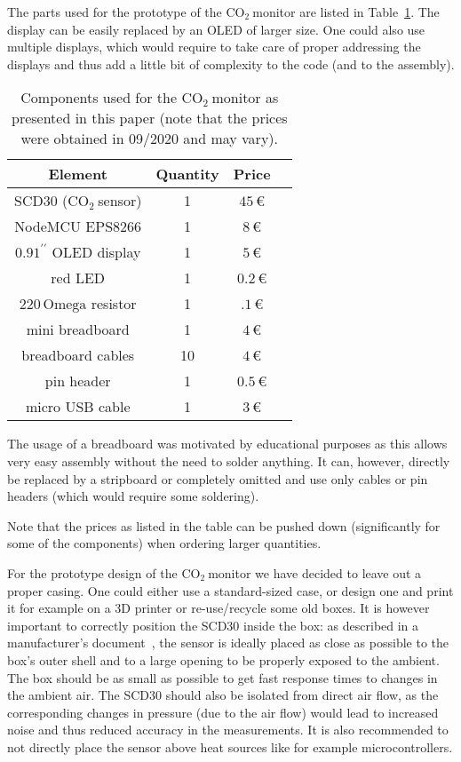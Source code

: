 \documentclass[12pt,a4paper]{article}
\newcommand{\inchsign}{^{\prime\prime}}
\newcommand{\coo}{\ensuremath{\mathrm{CO_2}~}}
\begin{document}
The parts used for the prototype of the \coo monitor are listed in Table~\ref{t:parts}. The display can be easily replaced by an OLED of larger size. One could also use multiple displays, which would require to take care of proper addressing the displays and thus add a little bit of complexity to the code (and to the assembly). 
\begin{table}\label{t:parts}
\center
\begin{tabular}{cccc}\toprule
Element & Quantity & Price \\\hline
SCD30 (\coo sensor) & 1 & $45\,$\euro \\
NodeMCU EPS8266 & 1 & $8\,$\euro \\
$0.91\inchsign$ OLED display	& 1	& $5\,$\euro \\
red LED					& 1 	& $0.2\,$\euro \\
$220\,\mathrm{Omega}$ resistor	& 1	& $.1\,$\euro \\
mini breadboard		& 1 & $4\,$\euro \\
breadboard cables	& 10 & $4\,$\euro \\
pin header			& 1 & $0.5\,$\euro \\
micro USB cable		& 1 & $3\,$\euro \\
\bottomrule
\end{tabular}
\caption{Components used for the \coo monitor as presented in this paper (note that the prices were obtained in 09/2020 and may vary).}
\end{table}

The usage of a breadboard was motivated by educational purposes as this allows very easy assembly without the need to solder anything. It can, however, directly be replaced by a stripboard or completely omitted and use only cables or pin headers (which would require some soldering). 

Note that the prices as listed in the table can be pushed down (significantly for some of the components) when ordering larger quantities. 

For the prototype design of the \coo monitor we have decided to leave out a proper casing. One could either use a standard-sized case, or design one and print it for example on a 3D printer or re-use/recycle some old boxes. It is however important to correctly position the SCD30 inside the box: as described in a manufacturer's document~\cite{SENSIRION2020A}, the sensor is ideally placed as close as possible to the box's outer shell and to a large opening to be properly exposed to the ambient. The box should be as small as possible to get fast response times to changes in the ambient air. The SCD30 should also be isolated from direct air flow, as the corresponding changes in pressure (due to the air flow) would lead to increased noise and thus reduced accuracy in the measurements. It is also recommended to not directly place the sensor above heat sources like for example microcontrollers.
\end{document}
